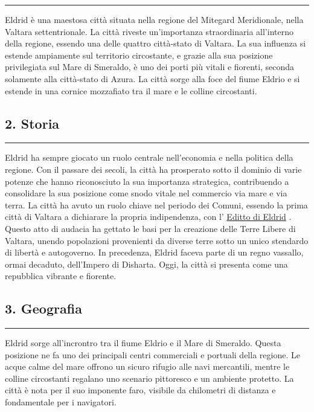 \begin{center}\rule{0.5\linewidth}{0.5pt}\end{center}

Eldrid è una maestosa città situata nella regione del Mitegard
Meridionale, nella Valtara settentrionale. La città riveste
un'importanza straordinaria all'interno della regione, essendo una delle
quattro città-stato di Valtara. La sua influenza si estende ampiamente
sul territorio circostante, e grazie alla sua posizione privilegiata sul
Mare di Smeraldo, è uno dei porti più vitali e fiorenti, seconda
solamente alla città-stato di Azura. La città sorge alla foce del fiume
Eldrio e si estende in una cornice mozzafiato tra il mare e le colline
circostanti.

\subsection{2. Storia}\label{storia}

\begin{center}\rule{0.5\linewidth}{0.5pt}\end{center}

Eldrid ha sempre giocato un ruolo centrale nell'economia e nella
politica della regione. Con il passare dei secoli, la città ha
prosperato sotto il dominio di varie potenze che hanno riconosciuto la
sua importanza strategica, contribuendo a consolidare la sua posizione
come snodo vitale nel commercio via mare e via terra. La città ha avuto
un ruolo chiave nel periodo dei Comuni, essendo la prima città di
Valtara a dichiarare la propria indipendenza, con l'
\href{Editto\%20di\%20Eldrid\%20fc90df43131849e391648cf2cbc2d5b1.md}{Editto
di Eldrid} . Questo atto di audacia ha gettato le basi per la creazione
delle Terre Libere di Valtara, unendo popolazioni provenienti da diverse
terre sotto un unico stendardo di libertà e autogoverno. In precedenza,
Eldrid faceva parte di un regno vassallo, ormai decaduto, dell'Impero di
Disharta. Oggi, la città si presenta come una repubblica vibrante e
fiorente.

\subsection{3. Geografia}\label{geografia}

\begin{center}\rule{0.5\linewidth}{0.5pt}\end{center}

Eldrid sorge all'incrontro tra il fiume Eldrio e il Mare di Smeraldo.
Questa posizione ne fa uno dei principali centri commerciali e portuali
della regione. Le acque calme del mare offrono un sicuro rifugio alle
navi mercantili, mentre le colline circostanti regalano uno scenario
pittoresco e un ambiente protetto. La città è nota per il suo imponente
faro, visibile da chilometri di distanza e fondamentale per i
navigatori.

